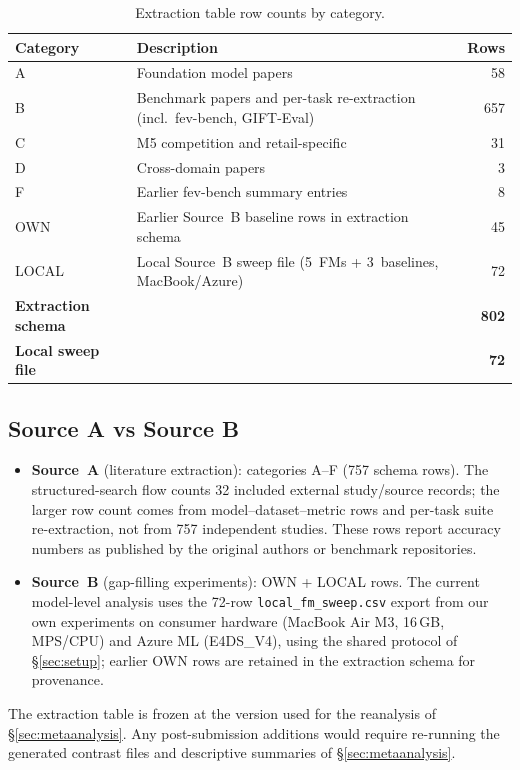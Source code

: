 \begin{table}[htbp]
\centering
\caption{Extraction table row counts by category.}\label{tab:extraction-counts}
\begin{tabularx}{\textwidth}{lXr}
\toprule
Category & Description & Rows \\
\midrule
A     & Foundation model papers              & 58 \\
B     & Benchmark papers and per-task re-extraction (incl.\ fev-bench, GIFT-Eval) & 657 \\
C     & M5 competition and retail-specific   & 31 \\
D     & Cross-domain papers                  & 3 \\
F     & Earlier fev-bench summary entries     & 8 \\
OWN   & Earlier Source~B baseline rows in extraction schema & 45 \\
LOCAL & Local Source~B sweep file (5~FMs + 3~baselines, MacBook/Azure) & 72 \\
\midrule
\textbf{Extraction schema} & & \textbf{802} \\
\textbf{Local sweep file} & & \textbf{72} \\
\bottomrule
\end{tabularx}
\end{table}

\subsection{Source A vs Source B}

\begin{itemize}[nosep]
  \item \textbf{Source~A} (literature extraction): categories A--F
    (757 schema rows).  The structured-search flow counts 32 included
    external study/source records; the larger row count comes from
    model--dataset--metric rows and per-task suite re-extraction, not from
    757 independent studies.  These rows report
    accuracy numbers as published by the original authors or benchmark
    repositories.
  \item \textbf{Source~B} (gap-filling experiments): OWN + LOCAL
    rows. The current model-level analysis uses the 72-row
    \texttt{local\_fm\_sweep.csv} export from our own experiments on
    consumer hardware (MacBook Air M3, 16\,GB, MPS/CPU) and Azure ML (E4DS\_V4),
    using the shared protocol of \S\ref{sec:setup}; earlier OWN rows are retained in
    the extraction schema for provenance.
\end{itemize}

The extraction table is frozen at the version used for the reanalysis of
\S\ref{sec:metaanalysis}. Any post-submission additions would require re-running the generated
contrast files and descriptive summaries of \S\ref{sec:metaanalysis}.
